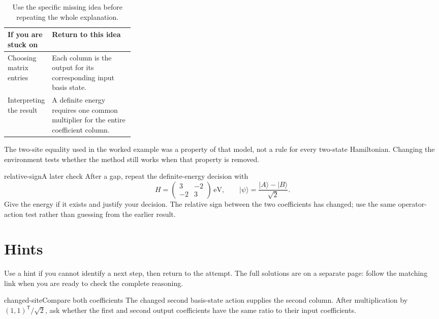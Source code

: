 \documentclass[11pt,a4paper]{article}
\begin{document}
\begin{table}[htbp]
\centering
\begin{tabularx}{\linewidth}{@{}p{0.29\linewidth}Y@{}}
\toprule
If you are stuck on & Return to this idea \\
\midrule
Choosing matrix entries & Each column is the output for its corresponding
  input basis state. \\
Interpreting the result & A definite energy requires one common multiplier
  for the entire coefficient column. \\
\bottomrule
\end{tabularx}
\caption{Use the specific missing idea before repeating the whole explanation.}
\end{table}

The two-site equality used in the worked example was a property of that
model, not a rule for every two-state Hamiltonian. Changing the environment
tests whether the method still works when that property is removed.

\begin{profattempt}{relative-sign}{A later check}
After a gap, repeat the definite-energy decision with
\[
 H=\begin{pmatrix}3&-2\\-2&3\end{pmatrix}\,\mathrm{eV},\qquad
 |\psi\rangle=\frac{|A\rangle-|B\rangle}{\sqrt{2}}.
\]
Give the energy if it exists and justify your decision. The relative sign
between the two coefficients has changed; use the same operator-action
test rather than guessing from the earlier result.
\end{profattempt}

\clearpage
\section{Hints}

Use a hint if you cannot identify a next step, then return to the attempt.
The full solutions are on a separate page: follow the matching link when
you are ready to check the complete reasoning.

\begin{profhint}{changed-site}{Compare both coefficients}
The changed second basis-state action supplies the second column. After
multiplication by $(1,1)^{\mathsf T}/\sqrt{2}$, ask whether the first and
second output coefficients have the same ratio to their input coefficients.
\end{profhint}
\end{document}
